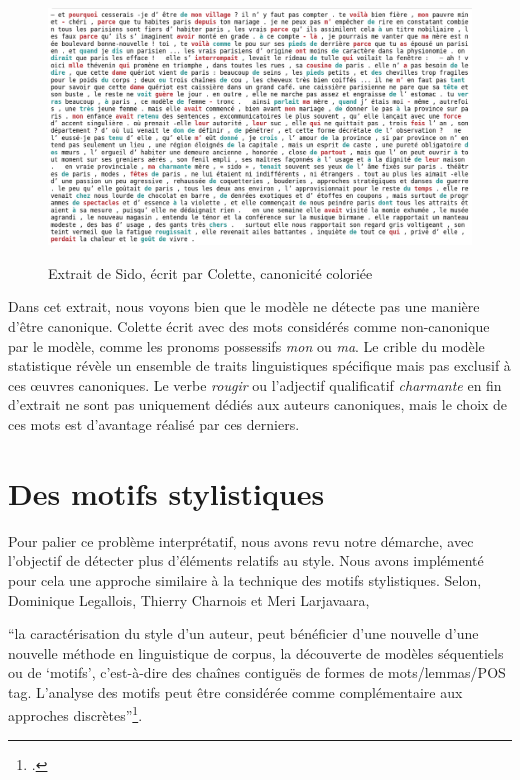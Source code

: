 \bigskip
\begin{figure}[!ht]
    \centering
    \includegraphics[width=18cm]{img/13_sido_colored.png}
    \label{extrait_colette}
    \caption{Extrait de Sido, écrit par Colette, canonicité coloriée}
\end{figure}

Dans cet extrait, nous voyons bien que le modèle ne détecte pas une manière d'être canonique. Colette écrit avec des mots considérés comme non-canonique par le modèle, comme les pronoms possessifs \textit{mon} ou \textit{ma}. Le crible du modèle statistique révèle un ensemble de traits linguistiques spécifique mais pas exclusif à ces œuvres canoniques. Le verbe \textit{rougir} ou l'adjectif qualificatif \textit{charmante} en fin d'extrait ne sont pas uniquement dédiés aux auteurs canoniques, mais le choix de ces mots est d'avantage réalisé par ces derniers.


\section{Des motifs stylistiques}

Pour palier ce problème interprétatif, nous avons revu notre démarche, avec l'objectif de détecter plus d'éléments relatifs au style. Nous avons implémenté pour cela une approche similaire à la technique des motifs stylistiques. Selon, Dominique Legallois, Thierry Charnois et Meri Larjavaara, 
\begin{displayquote}\enquote{la caractérisation du style d'un auteur, peut bénéficier d'une nouvelle d'une nouvelle méthode en linguistique de corpus, la découverte de modèles séquentiels ou de \enquote{motifs}, c'est-à-dire des chaînes contiguës de formes de mots/lemmas/POS tag. L'analyse des motifs peut être considérée comme complémentaire aux approches discrètes}\footcite{legallois_balance_2018}.
\end{displayquote}


